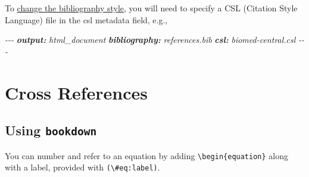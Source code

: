 \documentclass[
  a4paper,
  twoside,
  openright]{book}
\newenvironment{Shaded}{\begin{snugshade}}{\end{snugshade}}
\newcommand{\AnnotationTok}[1]{\textcolor[rgb]{0.56,0.35,0.01}{\textbf{\textit{#1}}}}
\newcommand{\CommentTok}[1]{\textcolor[rgb]{0.56,0.35,0.01}{\textit{#1}}}
\theoremstyle{definition}
\theoremstyle{definition}
\theoremstyle{definition}
\theoremstyle{definition}
\theoremstyle{remark}
\begin{document}
To \href{https://bookdown.org/yihui/rmarkdown-cookbook/bibliography.html\#changing-citation-style}{change the bibliography style}, you will need to specify a CSL (Citation Style Language) file in the csl metadata field, e.g.,

\begin{Shaded}
\begin{Highlighting}[]
\CommentTok{{-}{-}{-}}
\AnnotationTok{output:}\CommentTok{ html\_document}
\AnnotationTok{bibliography:}\CommentTok{ references.bib  }
\AnnotationTok{csl:}\CommentTok{ biomed{-}central.csl}
\CommentTok{{-}{-}{-}}
\end{Highlighting}
\end{Shaded}

\section{Cross References}\label{cross-references}

\subsection{\texorpdfstring{Using \texttt{bookdown}}{Using bookdown}}\label{using-bookdown}

You can number and refer to an equation by adding \texttt{\textbackslash{}begin\{equation\}} along with a label, provided with \texttt{(\textbackslash{}\#eq:label)}.
\end{document}
